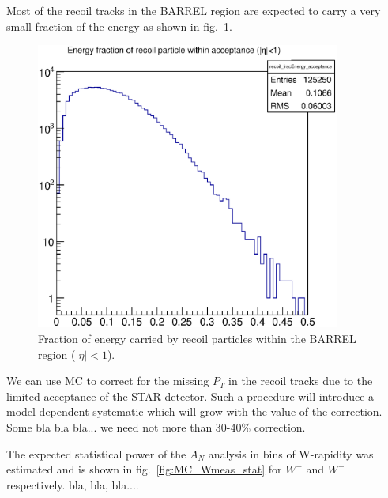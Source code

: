\documentclass[12pt]{article}
\begin{document}
Most of the recoil tracks in the BARREL region are expected to carry a very
small fraction of the energy as shown in fig.~\ref{fig:MC_recoil_Efrac}.

\begin{figure}[tbhp]
\begin{center}
\includegraphics[width=10cm]{images/recoil_energy_frac.eps}
\end{center}
\caption{\label{fig:MC_recoil_Efrac} Fraction of energy carried by recoil particles within the BARREL region ($|\eta|<1$).}
\end{figure}

We can use MC to correct for the missing $P_{T}$ in the recoil tracks due to the
limited acceptance of the STAR detector. Such a procedure will introduce a
model-dependent systematic which will grow with the value of the correction.
Some bla bla bla... we need not more than 30-40\% correction.

The expected statistical power of the $A_N$ analysis in bins of W-rapidity was
estimated and is shown in fig.~\ref{fig:MC_Wmeas_stat} for $W^+$ and $W^-$
respectively. bla, bla, bla....
\end{document}
